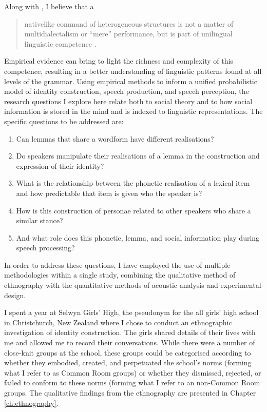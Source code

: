 Along with , I believe that a

\begin{quote}
	nativelike command of heterogeneous structures is not a matter of multidialectalism or ``mere'' performance, but is part of unilingual linguistic competence \cite[101]{weinrichlabovherzog1968}.
\end{quote}

\noindent Empirical evidence can bring to light the richness and complexity of this competence, resulting in a better understanding of linguistic patterns found at all levels of the grammar.  Using empirical methods to inform a unified probabilistic model of identity construction, speech production, and speech perception, the research questions I explore here relate both to social theory and to how social information is stored in the mind and is indexed to linguistic representations.  The specific questions to be addressed are:

\begin{enumerate}
	\item Can lemmas that share a wordform have different realisations? 
	\item Do speakers manipulate their realisations of a lemma in the construction and expression of their identity?  
	\item What is the relationship between the phonetic realisation of a lexical item and how predictable that item is given who the speaker is?
	\item How is this construction of personae related to other speakers who share a similar stance?
	\item And what role does this phonetic, lemma, and social information play during speech processing?   
\end{enumerate}

\noindent In order to address these questions, I have employed the use of multiple methodologies within a single study, combining the qualitative method of ethnography with the quantitative methods of acoustic analysis and experimental design. 

I spent a year at Selwyn Girls' High, the pseudonym for the all girls' high school in Christchurch, New Zealand where I chose to conduct an ethnographic investigation of identity construction.  The girls shared details of their lives with me and allowed me to record their conversations.  While there were a number of close-knit groups at the school, these groups could be categorised according to whether they embodied, created, and perpetuated the school's norms (forming what I refer to as Common Room groups) or whether they dismissed, rejected, or failed to conform to these norms (forming what I refer to an non-Common Room groups.  The qualitative findings from the ethnography are presented in Chapter \ref{ch:ethnography}.


